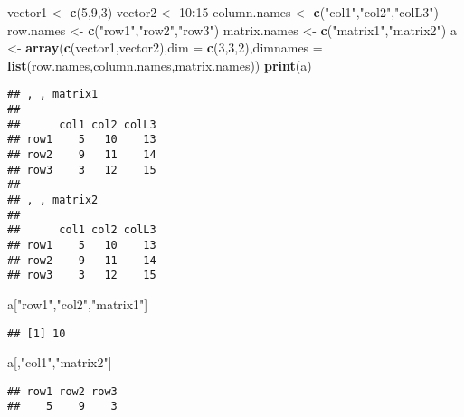 \documentclass[]{book}
\newenvironment{Shaded}{\begin{snugshade}}{\end{snugshade}}
\newcommand{\KeywordTok}[1]{\textcolor[rgb]{0.13,0.29,0.53}{\textbf{#1}}}
\newcommand{\DataTypeTok}[1]{\textcolor[rgb]{0.13,0.29,0.53}{#1}}
\newcommand{\DecValTok}[1]{\textcolor[rgb]{0.00,0.00,0.81}{#1}}
\newcommand{\StringTok}[1]{\textcolor[rgb]{0.31,0.60,0.02}{#1}}
\newcommand{\OperatorTok}[1]{\textcolor[rgb]{0.81,0.36,0.00}{\textbf{#1}}}
\newcommand{\NormalTok}[1]{#1}
\theoremstyle{definition}
\theoremstyle{definition}
\theoremstyle{definition}
\theoremstyle{remark}
\begin{document}
\begin{Shaded}
\begin{Highlighting}[]
\NormalTok{vector1 <-}\StringTok{ }\KeywordTok{c}\NormalTok{(}\DecValTok{5}\NormalTok{,}\DecValTok{9}\NormalTok{,}\DecValTok{3}\NormalTok{)}
\NormalTok{vector2 <-}\StringTok{ }\DecValTok{10}\OperatorTok{:}\DecValTok{15}
\NormalTok{column.names <-}\StringTok{ }\KeywordTok{c}\NormalTok{(}\StringTok{"col1"}\NormalTok{,}\StringTok{"col2"}\NormalTok{,}\StringTok{"colL3"}\NormalTok{)}
\NormalTok{row.names <-}\StringTok{ }\KeywordTok{c}\NormalTok{(}\StringTok{"row1"}\NormalTok{,}\StringTok{"row2"}\NormalTok{,}\StringTok{"row3"}\NormalTok{)}
\NormalTok{matrix.names <-}\StringTok{ }\KeywordTok{c}\NormalTok{(}\StringTok{"matrix1"}\NormalTok{,}\StringTok{"matrix2"}\NormalTok{)}
\NormalTok{a <-}\StringTok{ }\KeywordTok{array}\NormalTok{(}\KeywordTok{c}\NormalTok{(vector1,vector2),}\DataTypeTok{dim =} \KeywordTok{c}\NormalTok{(}\DecValTok{3}\NormalTok{,}\DecValTok{3}\NormalTok{,}\DecValTok{2}\NormalTok{),}\DataTypeTok{dimnames =} \KeywordTok{list}\NormalTok{(row.names,column.names,matrix.names))}
\KeywordTok{print}\NormalTok{(a)}
\end{Highlighting}
\end{Shaded}

\begin{verbatim}
## , , matrix1
## 
##      col1 col2 colL3
## row1    5   10    13
## row2    9   11    14
## row3    3   12    15
## 
## , , matrix2
## 
##      col1 col2 colL3
## row1    5   10    13
## row2    9   11    14
## row3    3   12    15
\end{verbatim}

\begin{Shaded}
\begin{Highlighting}[]
\NormalTok{a[}\StringTok{"row1"}\NormalTok{,}\StringTok{"col2"}\NormalTok{,}\StringTok{"matrix1"}\NormalTok{]}
\end{Highlighting}
\end{Shaded}

\begin{verbatim}
## [1] 10
\end{verbatim}

\begin{Shaded}
\begin{Highlighting}[]
\NormalTok{a[,}\StringTok{"col1"}\NormalTok{,}\StringTok{"matrix2"}\NormalTok{]}
\end{Highlighting}
\end{Shaded}

\begin{verbatim}
## row1 row2 row3 
##    5    9    3
\end{verbatim}
\end{document}
